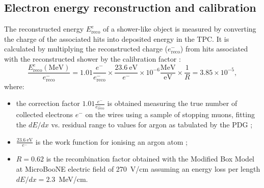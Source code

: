 \subsection{Electron energy reconstruction and calibration}\label{sec:showerenergy}
The reconstructed energy $E_{\mathrm{reco}}^{e}$ of a shower-like object is measured by converting the charge of the associated hits into deposited energy in the TPC. It is calculated by multiplying the reconstructed charge ($e^{-}_{\mathrm{reco}}$) from hits associated with the reconstructed shower by the calibration factor \cite{Acciarri:2017sjy}:
\begin{equation}
\frac{E_{\mathrm{reco}}^{e} \mathrm{(MeV)}}{e^{-}_{\mathrm{reco}}} = 1.01\frac{e^-}{e^{-}_{\mathrm{reco}}} \times \frac{23.6~\mathrm{eV}}{e^-} \times 10^{-6} \frac{\mathrm{MeV}}{\mathrm{eV}} \times \frac{1}{R} = 3.85\times10^{-5},\label{eq:calib}
\end{equation}
where:
\begin{itemize}

\item the correction factor $1.01\frac{e^-}{e^{-}_{\mathrm{reco}}}$ is obtained measuring the true number of collected electrons $e^{-}$ on the wires using a sample of stopping muons, fitting the $dE/dx$ vs. residual range to values for argon as tabulated by the PDG \cite{PhysRevD.98.030001};
\item $\frac{23.6~\mathrm{eV}}{e^-}$ is the work function for ionising an argon atom \cite{Shibamura:1975zz};
\item $R = 0.62$ is the recombination factor obtained with the Modified Box Model \cite{Acciarri:2013met} at MicroBooNE electric field of 270~V/cm assuming an energy loss per length $dE/dx=2.3$~MeV/cm.
\end{itemize}

